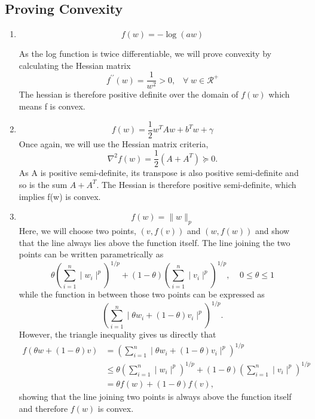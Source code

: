 \subsection{Proving Convexity}
\begin{enumerate}
\item\begin{equation}
f(w) = -\log(aw)
\end{equation}
\par As the log function is twice differentiable, we will prove convexity by calculating the Hessian matrix
\begin{equation}
f^{\prime\prime}(w) = \frac{1}{w^{2}}> 0,\;\;\; \forall\; w\in \mathcal{R}^{+}
\end{equation}
The hessian is therefore positive definite over the domain of $f(w)$ which means f is convex.

\par\item\begin{equation}
f(w) = \frac{1}{2}w^{T}Aw+b^{T}w+\gamma
\end{equation}
Once again, we will use the Hessian matrix criteria,
\begin{equation}
\nabla^{2}f(w) = \frac{1}{2}\left(A+A^{T}\right)\succeq 0.
\end{equation}
As A is positive semi-definite, its transpose is also positive semi-definite and so is the sum $A+A^{T}$.  The Hessian is therefore positive semi-definite, which implies f(w) is convex.

\par\item\begin{equation}
f(w) = \|w \|_{p}
\end{equation}
Here, we will choose two points, $(v,f(v))$ and $(w,f(w))$ and show that the line always lies above the function itself. The line joining the two points can be written parametrically as
\begin{equation}
\theta\left(\sum_{i=1}^{n}\mid w_{i}\mid^{p}\right)^{1/p}+(1-\theta)\left(\sum_{i=1}^{n}\mid v_{i}\mid^{p}\right)^{1/p},\;\;\;\; 0\le\theta \le 1
\end{equation}
while the function in between those two points can be expressed as
\begin{equation}
\left(\sum_{i=1}^{n}\mid \theta w_{i}+(1-\theta)v_{i}\mid^{p}\right)^{1/p}.
\end{equation}
However, the triangle inequality gives us directly that
\begin{align}
f(\theta w+(1-\theta)v)&=\left(\sum_{i=1}^{n}\mid \theta w_{i}+(1-\theta)v_{i}\mid^{p}\right)^{1/p}\\
&\le \theta\left(\sum_{i=1}^{n}\mid w_{i}\mid^{p}\right)^{1/p}+(1-\theta)\left(\sum_{i=1}^{n}\mid v_{i}\mid^{p}\right)^{1/p}\nonumber\\
&=\theta f(w)+(1-\theta)f(v),
\end{align}
showing that the line joining two points is always above the function itself and therefore $f(w)$ is convex.


\end{enumerate}
